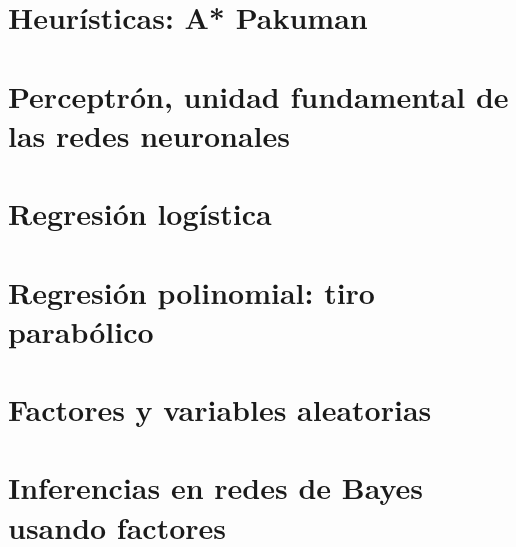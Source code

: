 \documentclass[12pt,openany]{book}
\begin{document}




\chapter{Heurísticas: A* Pakuman}






\chapter[Perceptrón]{Perceptrón, unidad fundamental de las redes neuronales}






\chapter{Regresión logística}





\chapter{Regresión polinomial: tiro parabólico}






\chapter{Factores y variables aleatorias}





\chapter[Inferencia]{Inferencias en redes de Bayes usando factores}
\end{document}
